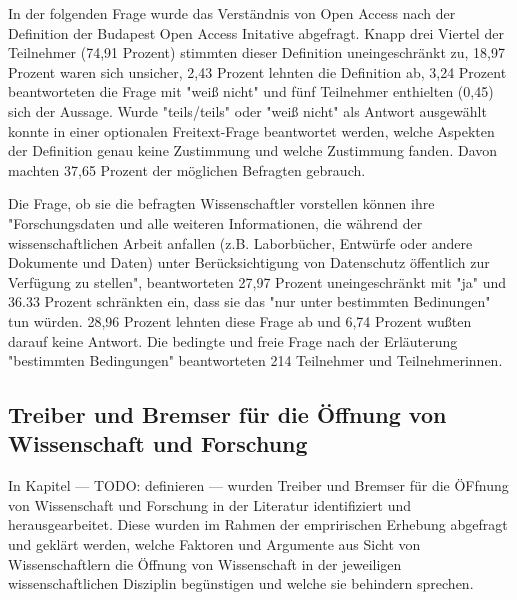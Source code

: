 In der folgenden Frage wurde das Verständnis von Open Access nach der Definition der Budapest Open Access Initative \cite{boai_2012} abgefragt. Knapp drei Viertel der Teilnehmer (74,91 Prozent) stimmten dieser Definition uneingeschränkt zu, 18,97 Prozent waren sich unsicher, 2,43 Prozent lehnten die Definition ab, 3,24 Prozent beantworteten die Frage mit "weiß nicht" und fünf Teilnehmer enthielten (0,45) sich der Aussage. Wurde "teils/teils" oder "weiß nicht" als Antwort ausgewählt konnte in einer optionalen Freitext-Frage beantwortet werden, welche Aspekten der Definition genau keine Zustimmung und welche Zustimmung fanden. Davon machten 37,65 Prozent der möglichen Befragten gebrauch.

Die Frage, ob sie die befragten Wissenschaftler vorstellen können ihre "Forschungsdaten und alle weiteren Informationen, die während der wissenschaftlichen Arbeit anfallen (z.B. Laborbücher, Entwürfe oder andere Dokumente und Daten) unter Berücksichtigung von Datenschutz öffentlich zur Verfügung zu stellen", beantworteten 27,97 Prozent uneingeschränkt mit "ja" und 36.33 Prozent schränkten ein, dass sie das "nur unter bestimmten Bedinungen" tun würden.  28,96 Prozent lehnten diese Frage ab und 6,74 Prozent wußten darauf keine Antwort. Die bedingte und freie Frage nach der Erläuterung "bestimmten Bedingungen" beantworteten 214 Teilnehmer und Teilnehmerinnen.

\subsection{Treiber und Bremser für die Öffnung von Wissenschaft und Forschung}

In Kapitel --- TODO: definieren --- wurden Treiber und Bremser für die ÖFfnung von Wissenschaft und Forschung in der Literatur identifiziert und herausgearbeitet. Diese wurden im Rahmen der empririschen Erhebung abgefragt und geklärt werden, welche Faktoren und Argumente aus Sicht von Wissenschaftlern die Öffnung von Wissenschaft in der jeweiligen wissenschaftlichen Disziplin begünstigen und welche sie behindern sprechen. 

